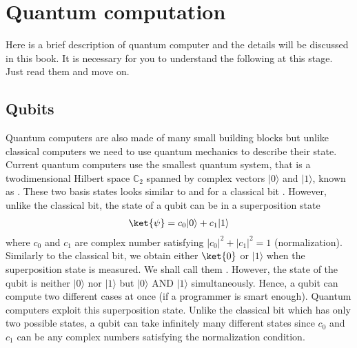 \documentclass[letterpaper,10pt,english]{jupyterBook}
\begin{document}
\sphinxstepscope


\section{Quantum computation}
\label{\detokenize{computation/qcomp:quantum-computation}}\label{\detokenize{computation/qcomp:sec-qcomp}}\label{\detokenize{computation/qcomp::doc}}
\sphinxAtStartPar
Here is a brief description of quantum computer and the details will be discussed in this book.  It is necessary for you to understand the following at this stage.  Just read them and move on.


\subsection{Qubits}
\label{\detokenize{computation/qcomp:qubits}}
\sphinxAtStartPar
Quantum computers are also made of many small building blocks but unlike classical computers we need to use quantum mechanics to describe their state. Current quantum computers use the smallest quantum system, that is a two\sphinxhyphen{}dimensional Hilbert space \(\mathbb{C}_2\) spanned by complex vectors \(\lvert 0 \rangle\) and \(\lvert 1 \rangle\), known as . These two basis states looks similar to  and  for a classical bit . However, unlike the classical bit,  the state of a qubit  can be in a superposition state
\begin{equation}\label{equation:computation/qcomp:eqn:superposition}
\begin{split}
\ket{\psi} = c_{0} \lvert 0 \rangle + c_{1} \lvert 1 \rangle
\end{split}
\end{equation}
\sphinxAtStartPar
where \(c_0\) and \(c_1\) are complex number satisfying \(|c_0|^2+|c_1|^2=1\) (normalization). Similarly to the classical bit, we obtain either \(\ket{0}\) or \(\lvert 1 \rangle\)  when the superposition state is measured.   We shall call them . However,  the state of the qubit is neither \(\lvert 0 \rangle\) nor \(\lvert 1 \rangle\)  but  \(\lvert 0 \rangle\) AND \(\lvert 1 \rangle\) simultaneously. Hence, a qubit can compute two different cases at once (if a programmer is smart enough). Quantum computers exploit this superposition state.  Unlike the classical bit which has only two possible states, a qubit can take infinitely many different states since \(c_0\) and \(c_1\) can be any complex numbers satisfying the normalization condition.
\end{document}
